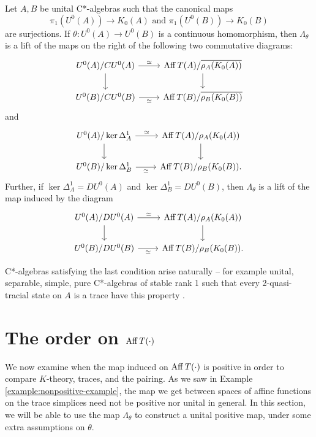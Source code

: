 \documentclass[12pt]{amsart}
\begin{document}
\begin{cor}
Let $A,B$ be unital C*-algebras such that the canonical maps
\begin{equation}
\pi_1(U^0(A)) \to K_0(A) \text{ and }\pi_1(U^0(B)) \to K_0(B)
\end{equation}
are surjections. If $\theta: U^0(A) \to U^0(B)$ is a continuous homomorphism, then $\Lambda_\theta$ is a lift of the maps on the right of the following two commutative diagrams:
\begin{equation}
\begin{tikzcd}
U^0(A)/CU^0(A) \arrow[r, "\simeq"] \arrow[d] & \Aff T(A)/\ov{\rho_A(K_0(A))} \arrow[d] \\
U^0(B)/CU^0(B) \arrow[r, "\simeq"']          & \Aff T(B)/\ov{\rho_B(K_0(B))}  
\end{tikzcd}
\end{equation}
and
\begin{equation}
\begin{tikzcd}
U^0(A)/\ker \Delta_A^1 \arrow[r, "\simeq"] \arrow[d] & \Aff T(A)/\rho_A(K_0(A)) \arrow[d] \\
U^0(B)/\ker \Delta_B^1\arrow[r, "\simeq"']          & \Aff T(B)/\rho_B(K_0(B))    .    
\end{tikzcd}
\end{equation}
Further, if $\ker \Delta_A^1 = DU^0(A)$ and $\ker \Delta_B^1 = DU^0(B)$, then $\Lambda_\theta$ is a lift of the map induced by the diagram
\begin{equation}
\begin{tikzcd}
U^0(A)/DU^0(A) \arrow[r, "\simeq"] \arrow[d] & \Aff T(A)/\rho_A(K_0(A)) \arrow[d] \\
U^0(B)/DU^0(B)\arrow[r, "\simeq"']          & \Aff T(B)/\rho_B(K_0(B))    .    
\end{tikzcd}
\end{equation}
\end{cor}

C*-algebras satisfying the last condition arise naturally -- for example unital, separable, simple, pure C*-algebras of stable rank 1 such that every 2-quasi\hyp{}tracial state on $A$ is a trace have this property \cite{NgRobert17}.


\section{The order on $\operatorname{Aff} T(\cdot)$}\label{section:ugh-order-on-aff-classification}

\hspace{\parindent}We now examine when the map induced on $\operatorname{Aff} T(\cdot)$ is positive in order to compare $K$-theory, traces, and the pairing. As we saw in Example \ref{example:nonpositive-example}, the map we get between spaces of affine functions on the trace simplices need not be positive nor unital in general. In this section, we will be able to use the map $\Lambda_\theta$ to construct a unital positive map, under some extra assumptions on $\theta$.
\end{document}
